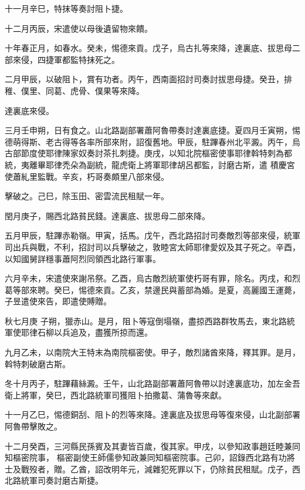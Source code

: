 \begin{pinyinscope}
 十一月辛巳，特抹等奏討阻卜捷。



 十二月丙辰，宋遣使以母後遺留物來饋。



 十年春正月，如春水。癸未，惕德來貢。戊子，烏古扎等來降，達裏底、拔思母二部來侵，四捷軍都監特抹死之。



 二月甲辰，以破阻卜，賞有功者。丙午，西南面招討司奏討拔思母捷。癸丑，排稚、僕里、同葛、虎骨、僕果等來降。



 達裏底來侵。



 三月壬申朔，日有食之。山北路副部署蕭阿魯帶奏討達裏底捷。夏四月壬寅朔，惕德萌得斯、老古得等各率所部來附，詔復舊地。甲辰，駐蹕春州北平澱。丙午，烏古部節度使耶律陳家奴奏討茶扎刺捷。庚戌，以知北院樞密使事耶律斡特刺為都統，夷離畢耶律禿朵為副統，龍虎衛上將軍耶律胡呂都監，討磨古斯，遣
 積慶宮使蕭糺里監戰。辛亥，朽哥奏頗里八部來侵。



 擊破之。己巳，除玉田、密雲流民租賦一年。



 閏月庚子，賜西北路貧民錢。達裏底、拔思母二部來降。



 五月甲辰，駐蹕赤勒嶺。甲寅，括馬。戊午，西北路招討司奏敵烈等部來侵，統軍司出兵與戰，不利，招討司以兵擊破之，敦睦宮太師耶律愛奴及其子死之。辛酉，以知國舅詳穩事蕭阿烈同領西北路行軍事。



 六月辛未，宋遣使來謝吊祭。乙酉，烏古敵烈統軍使朽哥有罪，除名。丙戌，和烈葛等部來聘。癸巳，惕德來貢。乙亥，禁邊民與蓄部為婚。是夏，高麗國王運薨，子昱遣使來告，即遣使賻贈。



 秋七月庚
 子朔，獵赤山。是月，阻卜等寇倒塌嶺，盡掠西路群牧馬去，東北路統軍使耶律石柳以兵追及，盡獲所掠而還。



 九月乙未，以南院大王特末為南院樞密使。甲子，敵烈諸酋來降，釋其罪。是月，斡特刺破磨古斯。



 冬十月丙子，駐蹕藉絲澱。壬午，山北路副部署蕭阿魯帶以討達裏底功，加左金吾衛上將軍，癸巳，西北路統軍司獲阻卜拍撒葛、蒲魯等來獻。



 十一月乙巳，惕德銅刮、阻卜的烈等來降。達裏底及拔思母等復來侵，山北副部署阿魯帶擊敗之。



 十二月癸酉，三河縣民孫賓及其妻皆百歲，復其家。甲戌，以參知政事趙廷睦兼同知樞密院事，
 樞密副使王師儒參知政兼同知樞密院事。己卯，詔錄西北路有功將士及戰歿者，贈。乙酋，詔改明年元，減雜犯死罪以下，仍除貧民租賦。戊子，西北路統軍司奏討磨古斯捷。



\end{pinyinscope}